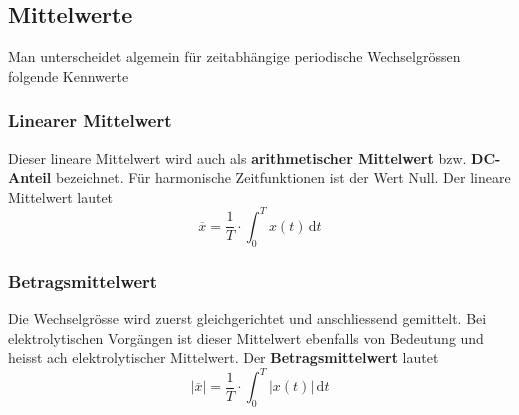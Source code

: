 \subsection{Mittelwerte}
Man unterscheidet algemein für zeitabhängige periodische Wechselgrössen folgende Kennwerte
\subsubsection{Linearer Mittelwert}
Dieser lineare Mittelwert wird auch als \textbf{arithmetischer Mittelwert} bzw. \textbf{DC-Anteil} bezeichnet. Für harmonische Zeitfunktionen ist der Wert Null. Der lineare Mittelwert lautet
\begin{equation}
\boxed{\overline{x}=\dfrac{1}{T}\cdot \displaystyle \int_0^Tx\left(t\right)\,\text{d}t}
\end{equation}
\subsubsection{Betragsmittelwert}
Die Wechselgrösse wird zuerst gleichgerichtet und anschliessend gemittelt. Bei elektrolytischen Vorgängen ist dieser Mittelwert ebenfalls von Bedeutung und heisst ach elektrolytischer Mittelwert. Der \textbf{Betragsmittelwert} lautet
\begin{equation}
\boxed{\Big\vert\overline{x}\Big\vert=\dfrac{1}{T}\cdot \displaystyle \int_0^T\Big\vert x\left(t\right)\Big\vert\,\text{d}t}
\end{equation}
